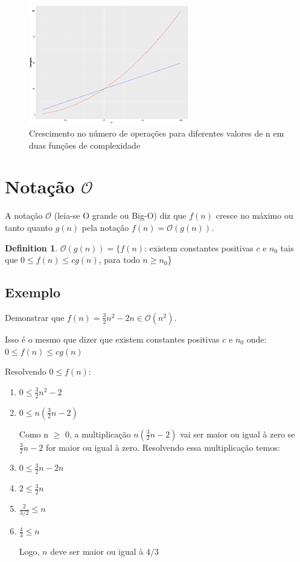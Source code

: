 \documentclass[ a4paper, twocolumn]{article}
\theoremstyle{definition}
\newtheorem{definition}{Definition}[section]
\begin{document}
\begin{figure}[h]
\begin{center}
	\includegraphics[width=7cm]{grow.png}
	\caption{Crescimento no número de operações para diferentes valores de n em duas funções de complexidade}
\end{center}
\end{figure}


\section{Notação $\mathcal{O}$}
A notação $\mathcal{O}$ (leia-se O grande ou Big-O) diz que $f(n)$ cresce no máximo ou tanto quanto $g(n)$ pela notação $f(n) = \mathcal{O}(g(n))$. 

\begin{definition}
$\mathcal{O}(g(n)) = \{f(n)$: existem constantes positivas $c$ e $n_0$ tais que $0 \leq f(n) \leq cg(n)$, para todo $n \geq n_0$\}
\end{definition}

\subsection{Exemplo}
Demonstrar que $f(n) = \frac{3}{2}n^2 - 2n \in \mathcal{O}(n^2)$. 

Isso é o mesmo que dizer que existem constantes positivas $c$ e $n_0$ onde: 
$0 \leq f(n) \leq cg(n)$

Resolvendo $0 \leq f(n)$:

\begin{enumerate}[Step 1:]
\item $0 \leq \frac{3}{2}n^2 - 2$

\item $0 \leq n(\frac{3}{2}n - 2)$

Como n  $\geq$ 0, a multiplicação $n(\frac{3}{2}n - 2)$ vai ser maior ou igual à zero se $\frac{3}{2}n - 2$ for maior ou igual à zero. Resolvendo essa multiplicação temos: 

\item $0 \leq \frac{3}{2}n - 2n$

\item $2 \leq \frac{3}{2}n$

\item $\frac{2}{3/2} \leq n$

\item $\frac{4}{3} \leq n$

Logo, $n$ deve ser maior ou igual à $4/3$

\end{enumerate}
\end{document}
